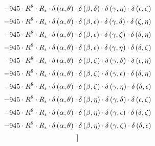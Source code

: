 \begin{subequations}
\begin{gather}
 \\[0.2em] \notag 		 - 945 \cdot R^{8} \cdot R_{\iota{}} \cdot \delta{}\left(\alpha{}, \theta{}\right) \cdot \delta{}\left(\beta{}, \delta{}\right) \cdot \delta{}\left(\gamma{}, \eta{}\right) \cdot \delta{}\left(\epsilon{}, \zeta{}\right) 
 \\[0.2em] \notag 		 - 945 \cdot R^{8} \cdot R_{\iota{}} \cdot \delta{}\left(\alpha{}, \theta{}\right) \cdot \delta{}\left(\beta{}, \epsilon{}\right) \cdot \delta{}\left(\gamma{}, \delta{}\right) \cdot \delta{}\left(\zeta{}, \eta{}\right) 
 \\[0.2em] \notag 		 - 945 \cdot R^{8} \cdot R_{\iota{}} \cdot \delta{}\left(\alpha{}, \theta{}\right) \cdot \delta{}\left(\beta{}, \epsilon{}\right) \cdot \delta{}\left(\gamma{}, \zeta{}\right) \cdot \delta{}\left(\delta{}, \eta{}\right) 
 \\[0.2em] \notag 		 - 945 \cdot R^{8} \cdot R_{\iota{}} \cdot \delta{}\left(\alpha{}, \theta{}\right) \cdot \delta{}\left(\beta{}, \epsilon{}\right) \cdot \delta{}\left(\gamma{}, \eta{}\right) \cdot \delta{}\left(\delta{}, \zeta{}\right) 
 \\[0.2em] \notag 		 - 945 \cdot R^{8} \cdot R_{\iota{}} \cdot \delta{}\left(\alpha{}, \theta{}\right) \cdot \delta{}\left(\beta{}, \zeta{}\right) \cdot \delta{}\left(\gamma{}, \delta{}\right) \cdot \delta{}\left(\epsilon{}, \eta{}\right) 
 \\[0.2em] \notag 		 - 945 \cdot R^{8} \cdot R_{\iota{}} \cdot \delta{}\left(\alpha{}, \theta{}\right) \cdot \delta{}\left(\beta{}, \zeta{}\right) \cdot \delta{}\left(\gamma{}, \epsilon{}\right) \cdot \delta{}\left(\delta{}, \eta{}\right) 
 \\[0.2em] \notag 		 - 945 \cdot R^{8} \cdot R_{\iota{}} \cdot \delta{}\left(\alpha{}, \theta{}\right) \cdot \delta{}\left(\beta{}, \zeta{}\right) \cdot \delta{}\left(\gamma{}, \eta{}\right) \cdot \delta{}\left(\delta{}, \epsilon{}\right) 
 \\[0.2em] \notag 		 - 945 \cdot R^{8} \cdot R_{\iota{}} \cdot \delta{}\left(\alpha{}, \theta{}\right) \cdot \delta{}\left(\beta{}, \eta{}\right) \cdot \delta{}\left(\gamma{}, \delta{}\right) \cdot \delta{}\left(\epsilon{}, \zeta{}\right) 
 \\[0.2em] \notag 		 - 945 \cdot R^{8} \cdot R_{\iota{}} \cdot \delta{}\left(\alpha{}, \theta{}\right) \cdot \delta{}\left(\beta{}, \eta{}\right) \cdot \delta{}\left(\gamma{}, \epsilon{}\right) \cdot \delta{}\left(\delta{}, \zeta{}\right) 
 \\[0.2em] \notag 		 - 945 \cdot R^{8} \cdot R_{\iota{}} \cdot \delta{}\left(\alpha{}, \theta{}\right) \cdot \delta{}\left(\beta{}, \eta{}\right) \cdot \delta{}\left(\gamma{}, \zeta{}\right) \cdot \delta{}\left(\delta{}, \epsilon{}\right)\\[0.2em] \notag ]
\end{gather}\end{subequations}